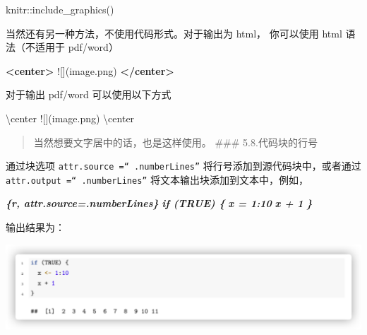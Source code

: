 \documentclass[
]{book}
\newenvironment{Shaded}{\begin{snugshade}}{\end{snugshade}}
\newcommand{\AlertTok}[1]{\textcolor[rgb]{0.94,0.16,0.16}{#1}}
\newcommand{\InformationTok}[1]{\textcolor[rgb]{0.56,0.35,0.01}{\textbf{\textit{#1}}}}
\newcommand{\KeywordTok}[1]{\textcolor[rgb]{0.13,0.29,0.53}{\textbf{#1}}}
\newcommand{\NormalTok}[1]{#1}
\begin{document}
\begin{Shaded}
\begin{Highlighting}[]
\NormalTok{knitr::include\_graphics()}
\end{Highlighting}
\end{Shaded}

当然还有另一种方法，不使用代码形式。对于输出为 html， 你可以使用 html
语法（不适用于 pdf/word）

\begin{Shaded}
\begin{Highlighting}[]
\KeywordTok{\textless{}center\textgreater{}} \AlertTok{![](image.png)} \KeywordTok{\textless{}/center\textgreater{}}
\end{Highlighting}
\end{Shaded}

对于输出 pdf/word 可以使用以下方式

\begin{Shaded}
\begin{Highlighting}[]
\NormalTok{\textbackslash{}center}
\AlertTok{![](image.png)}
\NormalTok{\textbackslash{}center}
\end{Highlighting}
\end{Shaded}

\begin{quote}
当然想要文字居中的话，也是这样使用。 \#\#\# 5.8.代码块的行号
\end{quote}

通过块选项 \texttt{attr.source\ =“\ .numberLines”}
将行号添加到源代码块中，或者通过 \texttt{attr.output\ =“\ .numberLines”}
将文本输出块添加到文本中，例如，

\begin{Shaded}
\begin{Highlighting}[]
\InformationTok{\textasciigrave{}\textasciigrave{}\textasciigrave{}\{r, attr.source=\textquotesingle{}.numberLines\textquotesingle{}\} }
\InformationTok{if (TRUE) \{}
\InformationTok{  x = 1:10}
\InformationTok{  x + 1}
\InformationTok{\}}
\InformationTok{\textasciigrave{}\textasciigrave{}\textasciigrave{}}
\end{Highlighting}
\end{Shaded}

输出结果为：

\includegraphics{images/paste-61B75CBE.png}
\end{document}
